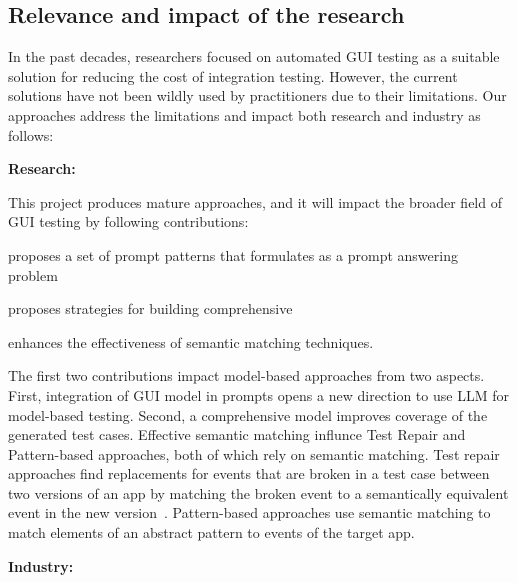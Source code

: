 \subsection{Relevance and impact of the research }


In the past decades, researchers focused on automated GUI testing as a suitable solution for reducing the cost of integration testing. However, the current solutions have not been wildly used by practitioners due to their limitations. 
Our approaches address the limitations and impact both research and industry as follows:




\smallskip
\noindent
\textbf{Research:}

\noindent
This project produces mature \testreuse approaches, and it will impact the broader field of GUI testing by following contributions: 
\begin{inparaenum}[(i)]
\item proposes a set of prompt patterns that formulates \testreuse as a prompt answering problem 
\item proposes strategies for building comprehensive  \tam
\item enhances the effectiveness of semantic matching techniques.
\end{inparaenum}

\smallskip
The first two contributions impact model-based approaches from two aspects.
First, integration of GUI model in prompts opens a new direction to use LLM for model-based testing.
Second, a comprehensive model improves coverage of the  generated test cases.
Effective semantic matching influnce Test Repair and Pattern-based approaches, both of which rely on semantic matching.
Test repair approaches find replacements for events that are broken in a test case between two versions of an app by matching the broken event to a semantically equivalent event in the new version~\cite{Pan:Meter:TSE:2022}.
Pattern-based approaches use semantic matching to match elements of an abstract pattern to events of the target app.


\smallskip
\noindent
\textbf{Industry:}

